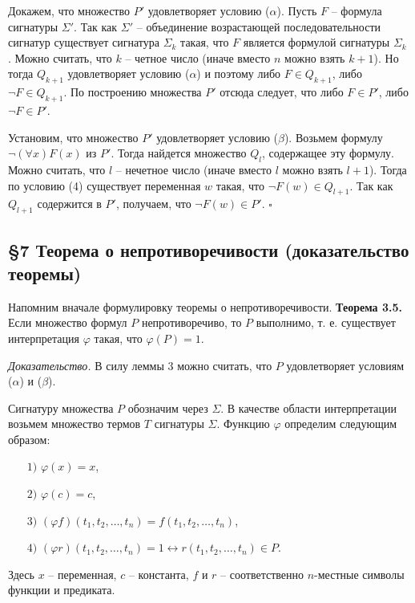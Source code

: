 \documentclass[a4paper]{article}
\begin{document}
Докажем, что множество $P'$ удовлетворяет условию ($\alpha$). Пусть $F$ -- формула сигнатуры $\Sigma'$. Так как $\Sigma'$ -- объединение возрастающей последовательности сигнатур существует сигнатура $\Sigma_k$ такая, что $F$ является формулой сигнатуры $\Sigma_k$ . Можно считать, что $k$ -- четное число (иначе вместо $n$ можно взять $k + 1$). Но тогда $Q_{k+1}$ удовлетворяет условию ($\alpha$) и поэтому либо $F \in  Q_{k+1}$, либо $\neg F \in Q_{k+1}$. По построению множества $P'$ отсюда следует, что либо $F \in P'$, либо $\neg F \in P'$. 

Установим, что множество $P'$ удовлетворяет условию ($\beta$). Возьмем формулу $\neg (\forall x)F(x)$ из $P'$. Тогда найдется множество $Q_l$, содержащее эту формулу. Можно считать, что $l$ -- нечетное число (иначе вместо $l$ можно взять $l + 1$). Тогда по условию (4) существует переменная $w$ такая, что $\neg F(w) \in Q_{l+1}$. Так как $Q_{l+1}$ содержится в $P'$, получаем, что $\neg F(w) \in P'$. $\square$

\subsection{\S7 Теорема о непротиворечивости (доказательство теоремы)}


Напомним вначале формулировку теоремы о непротиворечивости.
\textbf{Теорема 3.5.} Если множество формул $P$ непротиворечиво, то $P$ выполнимо, т. е. существует интерпретация $\varphi$ такая, что  $\varphi (P) = 1$.

\textit{Доказательство.} В силу леммы 3 можно считать, что $P$ удовлетворяет условиям ($\alpha$) и ($\beta$).

Сигнатуру множества $P$ обозначим через $\Sigma$. В качестве области интерпретации возьмем множество термов $T$ сигнатуры $\Sigma$. Функцию $\varphi$ определим следующим образом:
\begin{itemize}
	\item [$1)$] $\varphi(x) = x$,
	\item [$2)$] $\varphi(c) = c$,
	\item [$3)$] $(\varphi f)(t_1, t_2, \dots, t_n) = f(t_1, t_2, \dots, t_n)$,
	\item [$4)$] $(\varphi r)(t_1, t_2, \dots, t_n) = 1 \leftrightarrow r(t_1, t_2, \dots, t_n) \in P$. %
\end{itemize}


Здесь $x$ -- переменная, $c$ -- константа, $f$ и $r$ -- соответственно $n$-местные символы функции и предиката.
\end{document}
